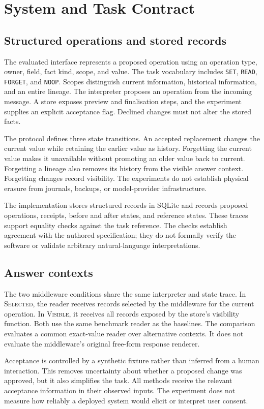 \documentclass[11pt,a4paper]{article}
\newcommand{\sel}{\textsc{Selected}}
\newcommand{\vis}{\textsc{Visible}}
\begin{document}
\section{System and Task Contract}
\subsection{Structured operations and stored records}
The evaluated interface represents a proposed operation using an operation type, owner, field, fact kind, scope, and value. The task vocabulary includes \texttt{SET}, \texttt{READ}, \texttt{FORGET}, and \texttt{NOOP}. Scopes distinguish current information, historical information, and an entire lineage. The interpreter proposes an operation from the incoming message. A store exposes preview and finalisation steps, and the experiment supplies an explicit acceptance flag. Declined changes must not alter the stored facts.

The protocol defines three state transitions. An accepted replacement changes the current value while retaining the earlier value as history. Forgetting the current value makes it unavailable without promoting an older value back to current. Forgetting a lineage also removes its history from the visible answer context. Forgetting changes record visibility. The experiments do not establish physical erasure from journals, backups, or model-provider infrastructure.

The implementation stores structured records in SQLite and records proposed operations, receipts, before and after states, and reference states. These traces support equality checks against the task reference. The checks establish agreement with the authored specification; they do not formally verify the software or validate arbitrary natural-language interpretations.

\subsection{Answer contexts}
The two middleware conditions share the same interpreter and state trace. In \sel{}, the reader receives records selected by the middleware for the current operation. In \vis{}, it receives all records exposed by the store's visibility function. Both use the same benchmark reader as the baselines. The comparison evaluates a common exact-value reader over alternative contexts. It does not evaluate the middleware's original free-form response renderer.

Acceptance is controlled by a synthetic fixture rather than inferred from a human interaction. This removes uncertainty about whether a proposed change was approved, but it also simplifies the task. All methods receive the relevant acceptance information in their observed inputs. The experiment does not measure how reliably a deployed system would elicit or interpret user consent.
\end{document}
